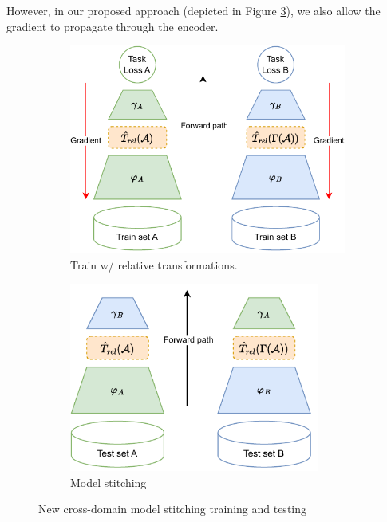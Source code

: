 \documentclass[../main.tex]{subfiles}
\begin{document}
However, in our proposed approach (depicted in Figure \ref{fig:fullCrossDomainScheme}), we also allow the gradient to propagate through the encoder.

\begin{figure}[ht!]
     \centering
    \begin{subfigure}[b]{0.45\textwidth}
         \centering
         \includegraphics[width=\textwidth]{figures/mt/relativeFullTrainScheme.pdf}
        \caption{Train w/ relative transformations.}
         \label{fig:relFullTrainScheme}
     \end{subfigure}\hfill
      \begin{subfigure}[b]{0.45\textwidth}
         \centering
         \includegraphics[width=0.9\textwidth]{figures/mt/relativeFullStitchScheme.pdf}
        \caption{Model stitching}
         \label{fig:relFullStitchScheme}
     \end{subfigure}
    \caption{New cross-domain model stitching training and testing}
    \label{fig:fullCrossDomainScheme}
\end{figure}
\end{document}
